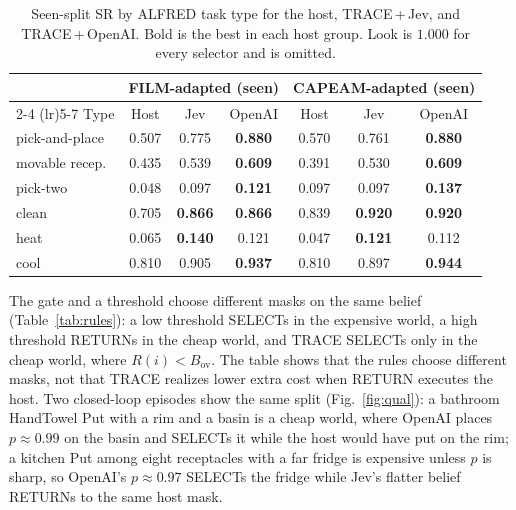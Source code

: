 \documentclass[conference]{IEEEtran}
\begin{document}
\begin{table}[!t]
\centering
\caption{Seen-split SR by ALFRED task type for the host, TRACE\,+\,Jev, and TRACE\,+\,OpenAI. Bold is the best in each host group. Look is $1.000$ for every selector and is omitted.} %
\label{tab:task}
\scriptsize
\setlength{\tabcolsep}{3.5pt}
\begin{tabular}{lcccccc}
\toprule
& \multicolumn{3}{c}{FILM-adapted (seen)} & \multicolumn{3}{c}{CAPEAM-adapted (seen)} \\
\cmidrule(lr){2-4} \cmidrule(lr){5-7}
Type & Host & Jev & OpenAI & Host & Jev & OpenAI \\
\midrule
pick-and-place & 0.507 & 0.775 & \textbf{0.880} & 0.570 & 0.761 & \textbf{0.880} \\
movable recep.\ & 0.435 & 0.539 & \textbf{0.609} & 0.391 & 0.530 & \textbf{0.609} \\
pick-two       & 0.048 & 0.097 & \textbf{0.121} & 0.097 & 0.097 & \textbf{0.137} \\
clean          & 0.705 & \textbf{0.866} & \textbf{0.866} & 0.839 & \textbf{0.920} & \textbf{0.920} \\
heat           & 0.065 & \textbf{0.140} & 0.121 & 0.047 & \textbf{0.121} & 0.112 \\
cool           & 0.810 & 0.905 & \textbf{0.937} & 0.810 & 0.897 & \textbf{0.944} \\
\bottomrule
\end{tabular}
\end{table}

The gate and a threshold choose different masks on the same belief (Table~\ref{tab:rules}): a low threshold SELECTs in the expensive world, a high threshold RETURNs in the cheap world, and TRACE SELECTs only in the cheap world, where $R(i){<}B_{\mathrm{ov}}$.
The table shows that the rules choose different masks, not that TRACE realizes lower extra cost when RETURN executes the host.
Two closed-loop episodes show the same split (Fig.~\ref{fig:qual}): a bathroom HandTowel Put with a rim and a basin is a cheap world, where OpenAI places $p{\approx}0.99$ on the basin and SELECTs it while the host would have put on the rim; a kitchen Put among eight receptacles with a far fridge is expensive unless $p$ is sharp, so OpenAI's $p{\approx}0.97$ SELECTs the fridge while Jev's flatter belief RETURNs to the same host mask.
\end{document}
